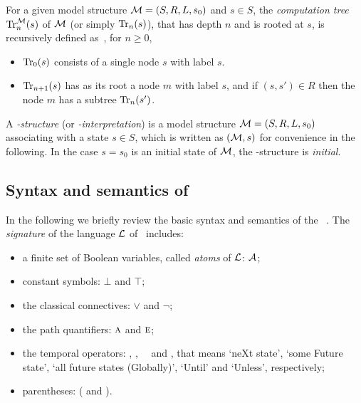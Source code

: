 \documentclass{article}
\begin{document}
For a given model structure ${\cal M}=(S,R,L,s_0)$ and $s\in S$,
the {\em computation tree}
$\textrm{Tr}_n^{\cal M}(s)$ of $\cal M$ (or simply $\textrm{Tr}_n(s)$), that has depth $n$ and is rooted at $s$, is recursively defined as~\cite{DBLP:journals/tcs/BrowneCG88}, for $n\ge 0$,
\begin{itemize}
  \item $\textrm{Tr}_0(s)$ consists of a single node $s$ with label $s$.
  \item $\textrm{Tr}_{n+1}(s)$ has as its root a node $m$ with label  $s$, and
  if $(s,s')\in R$ then the node $m$ has a subtree $\textrm{Tr}_n(s')$.
\end{itemize}

A {\em \MPK-structure} (or {\em \MPK-interpretation}) is a model structure
${\cal M}=(S, R, L, s_0)$ associating
with a state $s\in S$, which is written as $({\cal M},s)$ for convenience in the following.
In the case $s=s_0$ is an initial state of $\cal M$, the \MPK-structure is {\em initial}.



\subsection{Syntax and semantics of \CTL}
In the following we briefly review the basic syntax and semantics
of the \CTL~\cite{DBLP:journals/toplas/ClarkeES86}.
The {\em signature} of the language $\cal L$ of \CTL\ includes:
\begin{itemize}
  \item a finite set of Boolean variables, called {\em atoms} of $\cal L$: $\cal A$;
  \item constant symbols: $\bot$ and $\top$;
  \item the classical connectives: $\lor$ and $\neg$;
  \item the path quantifiers: $\textsc{a}$ and $\textsc{e}$;
  \item the temporal operators: \NEXT, \FUTURE, \GLOBAL\, \UNTIL\ and \UNLESS, that
  means `neXt state', `some Future state', `all future states (Globally)', `Until' and `Unless', respectively;
  \item parentheses: ( and ).
\end{itemize}
\end{document}
